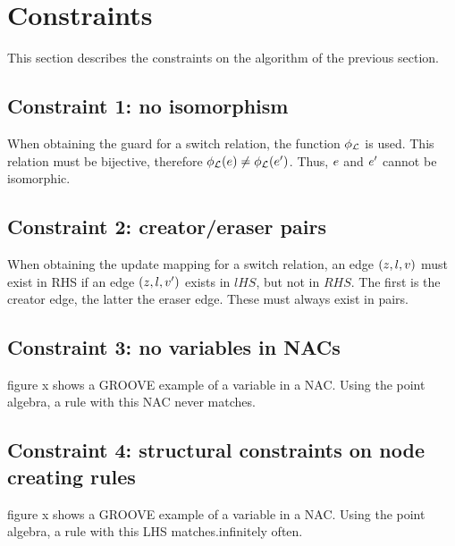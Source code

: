 \section{Constraints}

This section describes the constraints on the algorithm of the previous section.

\subsection{Constraint 1: no isomorphism}
When obtaining the guard for a switch relation, the function $\phi_{\mathcal{L}}$ is used. This relation must be bijective, therefore $\phi_{\mathcal{L}}(e) \neq \phi_{\mathcal{L}}(e')$. Thus, $e$ and $e'$ cannot be isomorphic.

\subsection{Constraint 2: creator/eraser pairs}
When obtaining the update mapping for a switch relation, an edge $(z, l, v)$ must exist in RHS if an edge $(z, l, v')$ exists in $lHS$, but not in $RHS$. The first is the creator edge, the latter the eraser edge. These must always exist in pairs. 

\subsection{Constraint 3: no variables in NACs}
figure x shows a GROOVE example of a variable in a NAC. Using the point algebra, a rule with this NAC never matches.

\subsection{Constraint 4: structural constraints on node creating rules}
figure x shows a GROOVE example of a variable in a NAC. Using the point algebra, a rule with this LHS matches.infinitely often.
